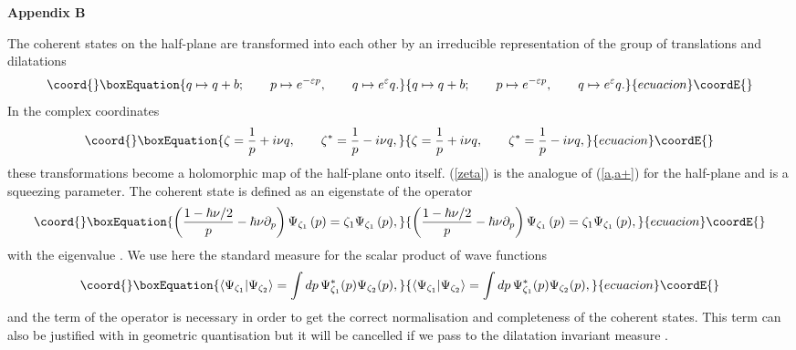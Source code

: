 \documentclass[a4paper,12pt]{article}
\def\theequation{\arabic{section}.\arabic{equation}}
\begin{document}
\vspace{1cm}

\setcounter{equation}{0}
\def\theequation{B.\arabic{equation}}

{\bf {\Large Appendix B}}

\vspace{0.5cm}

\noindent
The coherent states on the half-plane \coordHE{} are transformed into each other
by an irreducible representation of the group of translations and dilatations
\begin{equation}\coord{}\boxEquation{\label{T+D}
 q\mapsto q+b;~~~~~~p\mapsto  e^{-\varepsilon p},~~~~~~q\mapsto
e^{\varepsilon}q.
}{q\mapsto q+b;~~~~~~p\mapsto  e^{-\varepsilon p},~~~~~~q\mapsto
e^{\varepsilon}q.
}{ecuacion}\coordE{}\end{equation}
In the complex coordinates
\begin{equation}\coord{}\boxEquation{\label{zeta}
\zeta=\frac{1}{p}+i\nu q,~~~~~~\zeta^*=\frac{1}{p}-i\nu q,
}{\zeta=\frac{1}{p}+i\nu q,~~~~~~\zeta^*=\frac{1}{p}-i\nu q,
}{ecuacion}\coordE{}\end{equation}
these transformations become a  holomorphic map
\coordHE{}
of the half-plane onto itself.
(\ref{zeta}) is the analogue of (\ref{a,a+})
for the half-plane and \myHighlight{$\nu$}\coordHE{} is a squeezing parameter.
The coherent state \coordHE{} is defined as an eigenstate
of the operator
\coordHE{}
\begin{equation}\coord{}\boxEquation{\label{eigenv-z}
\left( \frac{1-\hbar\nu/2}{p}-\hbar\nu\partial_p\right)\Psi_{\zeta_1}\,(p)=
\zeta_1\Psi_{\zeta_1}\,(p),
}{\left( \frac{1-\hbar\nu/2}{p}-\hbar\nu\partial_p\right)\Psi_{\zeta_1}\,(p)=
\zeta_1\Psi_{\zeta_1}\,(p),
}{ecuacion}\coordE{}\end{equation}
with the  eigenvalue \coordHE{}.
We use here the standard measure \coordHE{} for the scalar product of
wave functions
\begin{equation}\coord{}\boxEquation{\label{scalar-pr}
\langle \Psi_{\zeta_1}|\Psi_{\zeta_2} \rangle=\int dp\,\Psi_{\zeta_1}^*(p)
\Psi_{\zeta_2}(p),
}{\langle \Psi_{\zeta_1}|\Psi_{\zeta_2} \rangle=\int dp\,\Psi_{\zeta_1}^*(p)
\Psi_{\zeta_2}(p),
}{ecuacion}\coordE{}\end{equation}
and the term \coordHE{} of the operator
\myHighlight{$\hat \zeta$}\coordHE{} is necessary in order to
get the correct normalisation and completeness of the coherent states.
This term can also be justified with in
geometric quantisation \cite{Woodhouse} but
it will be cancelled if we pass to the dilatation invariant measure
\coordHE{}.
\end{document}
